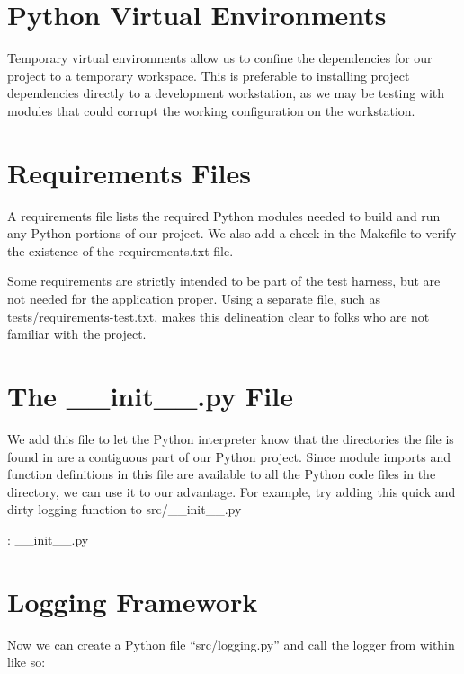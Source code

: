 \section{Python Virtual Environments}

\justifying
Temporary virtual environments allow us to confine the dependencies for our project to a temporary workspace.
This is preferable to installing project dependencies directly to a development workstation, as we may be
testing with modules that could corrupt the working configuration on the workstation.


\section{Requirements Files}

\justifying
A requirements file lists the required Python modules needed to build and run any Python portions of our
project. We also add a check in the Makefile to verify the existence of the requirements.txt file.

\justifying
Some requirements are strictly intended to be part of the test harness, but are not needed for the application
proper. Using a separate file, such as tests/requirements-test.txt, makes this delineation clear to folks who are not familiar with the project.


\section{The \_\_init\_\_.py File}

\justifying
We add this file to let the Python interpreter know that the directories the file is found in are a contiguous part of our Python project. Since module
imports and function definitions in this file are available to all the Python code files in the directory, we can use it to our advantage. For example, try
adding this quick and dirty logging function to src/\_\_init\_\_.py

\justifying
\begin{mybox}{\thetcbcounter: \_\_init\_\_.py}
  
\end{mybox}

\section{Logging Framework}
\justifying
Now we can create a Python file ``src/logging.py'' and call the logger from within like so:

